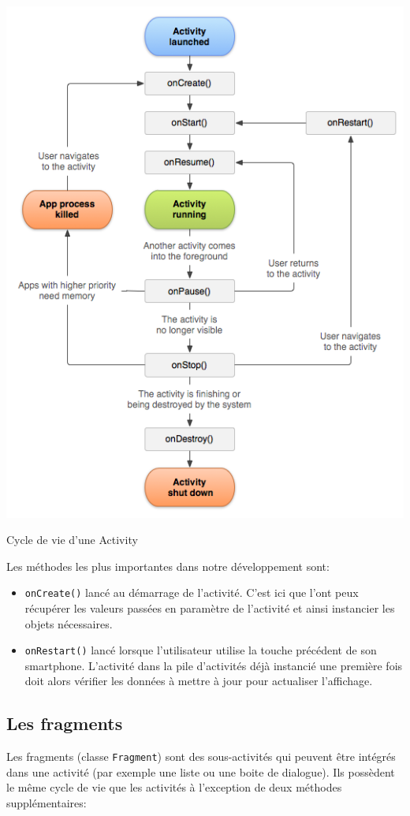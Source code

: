 \begin{img}
  \includegraphics[scale=0.5]{img/cycle.png}
  \caption{Cycle de vie d'une Activity}
\end{img}

Les méthodes les plus importantes dans notre développement sont:\bigskip
 \begin{itemize}
 	\item \verb!onCreate()! lancé au démarrage de l'activité. C'est ici que l'ont peux récupérer les valeurs passées en paramètre de l'activité et ainsi instancier les objets nécessaires.
 	\item \verb!onRestart()! lancé lorsque l'utilisateur utilise la touche précédent de son smartphone. L'activité dans la pile d'activités déjà instancié une première fois doit alors vérifier les données à mettre à jour pour actualiser l'affichage.
 \end{itemize}

\subsection{Les fragments}
Les fragments (classe \verb!Fragment!) sont des sous-activités qui peuvent être intégrés dans une activité (par exemple une liste ou une boite de dialogue). Ils possèdent le même cycle de vie que les activités à l'exception de deux méthodes supplémentaires:\bigskip
 
